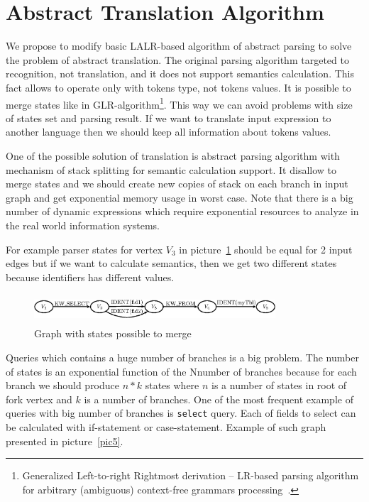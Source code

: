 \section{Abstract Translation Algorithm}
\label{sec:AbstractTranslation}

We propose to modify basic LALR-based algorithm of abstract parsing to solve the problem of abstract 
translation. The original parsing algorithm targeted to recognition, not translation, and it does not 
support semantics calculation. This fact allows to operate only with tokens type, not tokens values. 
It is possible to merge states like in GLR-algorithm\footnote{Generalized Left-to-right Rightmost 
derivation -- LR-based parsing algorithm for arbitrary (ambiguous) context-free grammars 
processing~\cite{Grune}.}. This way we can avoid problems with size of states set and parsing result.
If we want to translate input expression to another language then we should keep all information 
about tokens values. 

One of the possible solution of translation is abstract parsing algorithm with mechanism of stack 
splitting for semantic calculation support. It disallow to merge states and we should create new 
copies of stack on each branch in input graph and get exponential memory usage in worst case. 
Note that there is a big number of dynamic expressions which require exponential resources to 
analyze in the real world information systems. 

For example parser states for vertex $V_3$ in picture~\ref{pic4} should be equal for 2 input edges
but if we want to calculate semantics, then we get two different states because identifiers has 
different values.

\begin{figure}
    \begin{center}
        \includegraphics[width=9cm,height=1.1cm]{graphs/states_example.eps}
        \caption{Graph with states possible to merge}
        \label{pic4}
    \end{center}
\end{figure}

Queries which contains a huge number of branches is a big problem. The number of states is an 
exponential function of the Nnumber of branches because for each branch we should produce $n*k$ 
states where $n$ is a number of states in root of fork vertex and $k$ is a number of branches. 
One of the most frequent example of queries with big number of branches is \verb|select| query. 
Each of fields to select can be calculated with if-statement or case-statement. Example of such 
graph presented in picture~\ref{pic5}.

